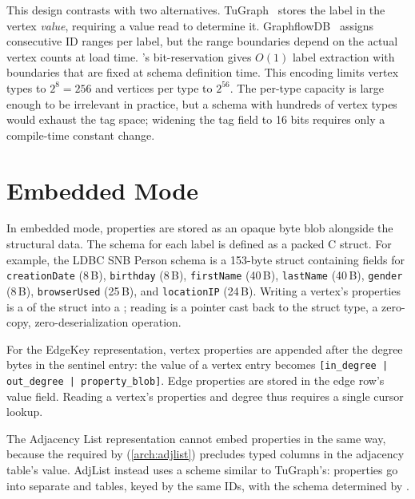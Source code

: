 This design contrasts with two alternatives.
TuGraph~\cite{linBuildingHighPerformanceGraph2024} stores the label in the vertex \emph{value}, requiring a value read to determine it.
GraphflowDB~\cite{graphflowdb2021Gupta} assigns consecutive ID ranges per label, but the range boundaries depend on the actual vertex counts at load time.
\project{}'s bit-reservation gives $O(1)$ label extraction with boundaries that are fixed at schema definition time.
This encoding limits vertex types to $2^{8} = 256$ and vertices per type to $2^{56}$.
The per-type capacity is large enough to be irrelevant in practice, but a schema with hundreds of vertex types would exhaust the tag space; widening the tag field to 16 bits requires only a compile-time constant change.

\section{Embedded Mode}
\label{arch:prop-embedded}

In embedded mode, properties are stored as an opaque byte blob alongside the structural data.
The schema for each label is defined as a packed C struct.
For example, the LDBC SNB Person schema is a 153-byte struct containing fields for \texttt{creationDate} (8\,B), \texttt{birthday} (8\,B), \texttt{firstName} (40\,B), \texttt{lastName} (40\,B), \texttt{gender} (8\,B), \texttt{browserUsed} (25\,B), and \texttt{locationIP} (24\,B).
Writing a vertex's properties is a  of the struct into a \wt{} ; reading is a pointer cast back to the struct type, a zero-copy, zero-deserialization operation.

For the EdgeKey representation, vertex properties are appended after the degree bytes in the sentinel entry: the value of a vertex entry becomes \texttt{[in\_degree\,|\,out\_degree\,|\,property\_blob]}.
Edge properties are stored in the edge row's value field.
Reading a vertex's properties and degree thus requires a single cursor lookup.

The Adjacency List representation cannot embed properties in the same way, because the  required by  (\autoref{arch:adjlist}) precludes typed columns in the adjacency table's value.
AdjList instead uses a scheme similar to TuGraph's: properties go into separate  and  tables, keyed by the same IDs, with the schema determined by .

